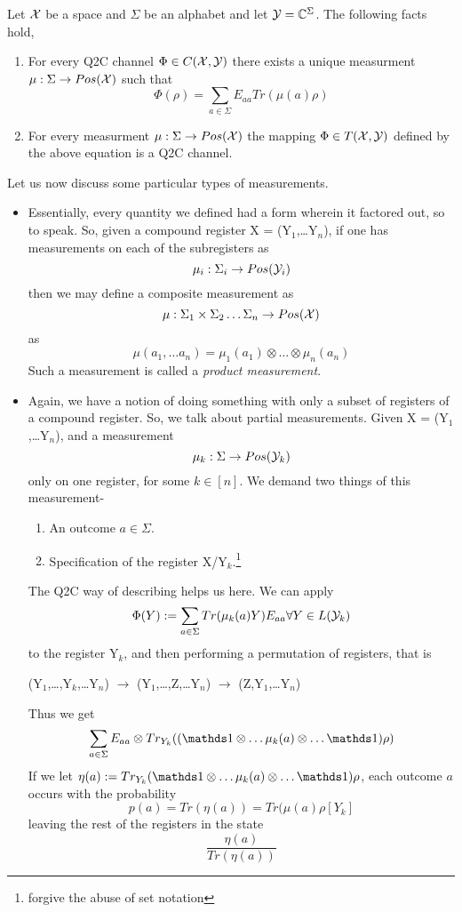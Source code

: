 \begin{theorem}[Equivalence]
Let $\mathcal{X}$ be a space and $\Sigma$ be an alphabet and let $\mathcal{Y} = \mathbb{C}^{\Sigma}$. The following facts hold,
\begin{enumerate}
    \item For every Q2C channel $\Phi\in C(\mathcal{X},\mathcal{Y})$ there exists a unique measurment $\mu:\Sigma \to Pos(\mathcal{X})$ such that
    \[\Phi(\rho) = \sum_{a\in\Sigma}E_{aa}Tr(\mu(a)\rho)\]
    \item For every measurment $\mu:\Sigma\to Pos(\mathcal{X})$ the mapping $\Phi\in T(\mathcal{X},\mathcal{Y})$ defined by the above equation is a Q2C channel.
\end{enumerate}
\end{theorem}
Let us now discuss some particular types of measurements.
\begin{itemize}
    \item Essentially, every quantity we defined had a form wherein it factored out, so to speak. So, given a compound register \textsf{X} = (\textsf{Y}$_1$,\dots \textsf{Y}$_n$), if one has measurements on each of the subregisters as 
    \[\mu_i:\Sigma_i\to Pos(\mathcal{Y}_i)\]
    then we may define a composite measurement as 
    \[\mu:\Sigma_1\times\Sigma_2\dots \Sigma_n\to Pos(\mathcal{X})\]
    as 
    \[\mu(a_1,\dots a_n) = \mu_1(a_1)\otimes\dots\otimes \mu_n(a_n)\]
    Such a measurement is called a \textit{product measurement}.
    \item Again, we have a notion of doing something with only a subset of registers of a compound register. So, we talk about partial measurements. Given \textsf{X} = (\textsf{Y}$_1$,\dots \textsf{Y}$_n$), and a measurement
    \[\mu_k:\Sigma\to Pos(\mathcal{Y}_k)\]
    only on one register, for some $k\in[n]$. We demand two things of this measurement-
    \begin{enumerate}
        \item An outcome $a\in\Sigma$.
        \item Specification of the register \textsf{X}/\textsf{Y}$_k$.\footnote{forgive the abuse of set notation}
    \end{enumerate}
    The Q2C way of describing helps us here. We can apply 
    \[\Phi(Y) := \sum_{a\in\Sigma}Tr(\mu_k(a)Y)E_{aa}\forall Y\in L(\mathcal{Y}_k)\]
    to the register \textsf{Y}$_k$, and then performing a permutation of registers, that is
    \begin{center}
        (\textsf{Y}$_1$,\dots,\textsf{Y}$_k$,\dots \textsf{Y}$_n$) $\to$ (\textsf{Y}$_1$,\dots,\textsf{Z},\dots \textsf{Y}$_n$) $\to$ (\textsf{Z},\textsf{Y}$_1$,\dots \textsf{Y}$_n$)
    \end{center}
    Thus we get
    \[\sum_{a\in\Sigma}E_{aa}\otimes Tr_{Y_k}((\iden \otimes \dots \mu_k(a)\otimes \dots \iden)\rho)\]
    If we let $\eta(a) := Tr_{Y_k}(\iden \otimes \dots \mu_k(a)\otimes \dots \iden)\rho$, each outcome $a$ occurs with the probability
    \[p(a) = Tr(\eta(a)) = Tr(\mu(a)\rho[Y_k]\]
    leaving the rest of the registers in the state
    \[\frac{\eta(a)}{Tr(\eta(a))}\]
    
    
\end{itemize}
